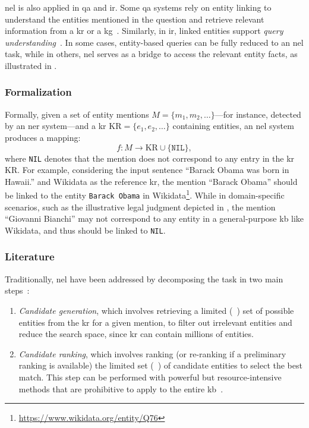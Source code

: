 \acl{nel} is also applied in \acl{qa} and \acf{ir}. Some \ac{qa} systems rely on entity linking to understand the entities mentioned in the question and retrieve relevant information from a \ac{kr} or a \ac{kg}~\cite{li-etal-2020-efficient,el_differences_for_qa_2022,eal_el_re_for_qa_2018}. Similarly, in \acl{ir}, linked entities support \emph{query understanding}~\cite{el_in_queries_2015}. In some cases, entity-based queries can be fully reduced to an \ac{nel} task, while in others, \ac{nel} serves as a bridge to access the relevant entity facts, as illustrated in .

\subsubsection{Formalization}
Formally, given a set of entity mentions $M = \{m_1, m_2, \ldots\}$---for instance, detected by an \ac{ner} system---and a \acl{kr} $\mathrm{KR} = \{e_1, e_2, \ldots\}$ containing entities, an \ac{nel} system produces a mapping:
\begin{equation}
f: M \to \mathrm{KR} \cup \{\texttt{NIL}\},
\end{equation}
where \texttt{NIL} denotes that the mention does not correspond to any entry in the \acl{kr} KR.  
For example, considering the input sentence ``Barack Obama was born in Hawaii.'' and Wikidata as the reference \ac{kr}, the mention ``Barack Obama'' should be linked to the entity \texttt{Barack Obama} in Wikidata\footnote{\url{https://www.wikidata.org/entity/Q76}}. While in domain-specific scenarios, such as the illustrative legal judgment depicted in , the mention ``Giovanni Bianchi'' may not correspond to any entity in a general-purpose \ac{kb} like Wikidata, and thus should be linked to \texttt{NIL}.


\subsubsection{Literature}
Traditionally, \ac{nel} have been addressed by decomposing the task in two main steps~\cite{entity_linking_with_kb_2015}:
\begin{enumerate}
    \item \emph{Candidate generation}, which involves retrieving a limited (~\cite{blink}) set of possible entities from the \ac{kr} for a given mention, to filter out irrelevant entities and reduce the search space, since \ac{kr} can contain millions of entities.
    \item \emph{Candidate ranking}, which involves ranking (or re-ranking if a preliminary ranking is available) the limited set (~\cite{blink}) of candidate entities to select the best match. This step can be performed with powerful but resource-intensive methods that are prohibitive to apply to the entire \ac{kb}~\cite{blink}.
\end{enumerate}

